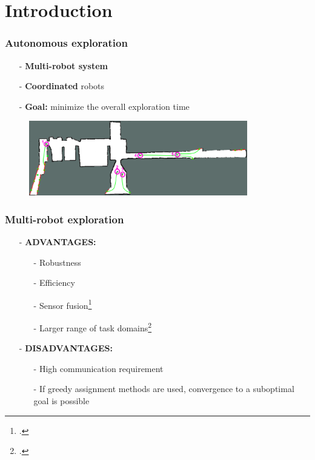 \section{Introduction}
\begin{frame}
	\frametitle{Autonomous exploration}
	\begin{itemize}
		\item[-] \textbf{Multi-robot system} 
		\item[-] \textbf{Coordinated} robots 
		\item[-] \textbf{Goal:} minimize the overall exploration time
	\end{itemize}
	\begin{figure}	
	\centering
	\includegraphics[width=0.85\textwidth]{figures/siminprogress1}
	\end{figure}
\end{frame}

\begin{frame}
	\frametitle{Multi-robot exploration}
	\begin{itemize}
		\item[-] \textbf{ADVANTAGES:}
		\begin{itemize}
			\item[-] Robustness %
			\item[-] Efficiency %
			\item[-] Sensor fusion\footcite{Wurm2008} %
			\item[-] Larger range of task domains\footcite{Dias2006}
		\end{itemize}
		\item[-] \textbf{DISADVANTAGES:}
		\begin{itemize}
			\item[-] High communication requirement%
			\item[-] If greedy assignment methods are used, convergence to a suboptimal goal is possible
		\end{itemize} 
	\end{itemize}
\end{frame}

